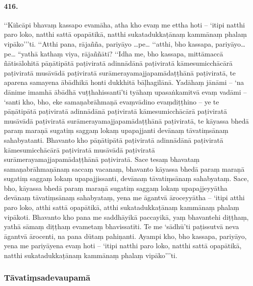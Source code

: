 \paragraph{416.} ‘‘Kiñcāpi bhavaṃ kassapo evamāha, atha kho evaṃ me ettha hoti – ‘itipi natthi paro loko, natthi sattā opapātikā, natthi sukatadukkaṭānaṃ kammānaṃ phalaṃ vipāko’’’ti. ‘‘Atthi pana, rājañña, pariyāyo …pe… ‘‘atthi, bho kassapa, pariyāyo…pe… ``yathā kathaṃ viya, rājaññāti? ‘‘Idha me, bho kassapa, mittāmaccā ñātisālohitā pāṇātipātā paṭiviratā adinnādānā paṭiviratā kāmesumicchācārā paṭiviratā musāvādā paṭiviratā surāmerayamajjapamādaṭṭhānā paṭiviratā, te aparena samayena ābādhikā honti dukkhitā bāḷhagilānā. Yadāhaṃ jānāmi – ‘na dānime imamhā ābādhā vuṭṭhahissantī’ti tyāhaṃ upasaṅkamitvā evaṃ vadāmi – ‘santi kho, bho, eke samaṇabrāhmaṇā evaṃvādino evaṃdiṭṭhino – ye te pāṇātipātā paṭiviratā adinnādānā paṭiviratā kāmesumicchācārā paṭiviratā musāvādā paṭiviratā surāmerayamajjapamādaṭṭhānā paṭiviratā, te kāyassa bhedā paraṃ maraṇā sugatiṃ saggaṃ lokaṃ upapajjanti devānaṃ tāvatiṃsānaṃ sahabyatanti. Bhavanto kho pāṇātipātā paṭiviratā adinnādānā paṭiviratā kāmesumicchācārā paṭiviratā musāvādā paṭiviratā surāmerayamajjapamādaṭṭhānā paṭiviratā. Sace tesaṃ bhavataṃ samaṇabrāhmaṇānaṃ saccaṃ vacanaṃ, bhavanto kāyassa bhedā paraṃ maraṇā sugatiṃ saggaṃ lokaṃ upapajjissanti, devānaṃ tāvatiṃsānaṃ sahabyataṃ. Sace, bho, kāyassa bhedā paraṃ maraṇā sugatiṃ saggaṃ lokaṃ upapajjeyyātha devānaṃ tāvatiṃsānaṃ sahabyataṃ, yena me āgantvā āroceyyātha – `itipi atthi paro loko, atthi sattā opapātikā, atthi sukatadukkaṭānaṃ kammānaṃ phalaṃ vipākoti. Bhavanto kho pana me saddhāyikā paccayikā, yaṃ bhavantehi diṭṭhaṃ, yathā sāmaṃ diṭṭhaṃ evametaṃ bhavissatīti. Te me ‘sādhū’ti paṭissutvā neva āgantvā ārocenti, na pana dūtaṃ pahiṇanti. Ayampi kho, bho kassapa, pariyāyo, yena me pariyāyena evaṃ hoti – ‘itipi natthi paro loko, natthi sattā opapātikā, natthi sukatadukkaṭānaṃ kammānaṃ phalaṃ vipāko’’’ti.

\subsubsection{Tāvatiṃsadevaupamā}

